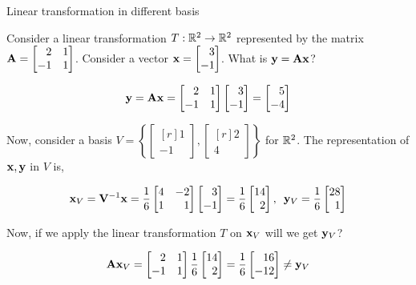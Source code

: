 \documentclass[aspectratio=169]{beamer}
\def\mf{\ensuremath\mathbf}
\def\mb{\ensuremath\mathbb}
\begin{document}
\begin{frame}[t]{Linear transformation in different basis}
\begin{small}
Consider a linear transformation $T: \mb{R}^2 \to \mb{R}^2$ represented by the matrix $\mf{A} = \begin{bmatrix*}[r]2 & 1\\-1 & 1\end{bmatrix*}$. Consider a vector $\mf{x} = \begin{bmatrix*}[r]3\\-1\end{bmatrix*}$. What is $\mf{y} = \mf{Ax}$?

\[ \mf{y} = \mf{Ax} = \begin{bmatrix*}[r]2 & 1\\-1 & 1\end{bmatrix*}\begin{bmatrix*}[r]3\\-1\end{bmatrix*} = \begin{bmatrix*}[r]5\\-4\end{bmatrix*} \]

Now, consider a basis $V = \left\{\begin{bmatrix*}[r]1\\-1\end{bmatrix*}, \begin{bmatrix*}[r]2\\4\end{bmatrix*}\right\}$ for $\mb{R}^2$. The representation of $\mf{x}, \mf{y}$ in $V$ is, 

\[ \mf{x}_V = \mf{V}^{-1}\mf{x} = \frac{1}{6}\begin{bmatrix*}[r]4 & -2\\1 & 1\end{bmatrix*}\begin{bmatrix*}[r]3\\-1\end{bmatrix*} = \frac{1}{6}\begin{bmatrix*}[r]14\\2\end{bmatrix*}, \,\,\, \mf{y}_V = \frac{1}{6}\begin{bmatrix*}[r]28\\1\end{bmatrix*}\]

Now, if we apply the linear transformation $T$ on $\mf{x}_V$ will we get $\mf{y}_V$?

\[ \mf{A}\mf{x}_V = \begin{bmatrix*}[r]2 & 1\\-1 & 1\end{bmatrix*}\frac{1}{6}\begin{bmatrix*}[r]14\\2\end{bmatrix*} = \frac{1}{6}\begin{bmatrix*}[r]16\\-12\end{bmatrix*} \neq \mf{y}_V \]


\end{small}
\end{frame}
\end{document}
